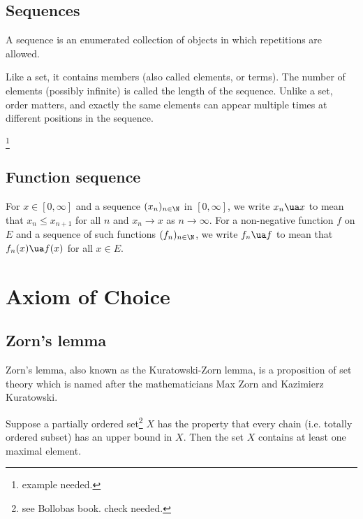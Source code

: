 \subsection{Sequences}

\begin{definition}[sequence]
A sequence is an enumerated collection of objects in which repetitions are allowed.
\end{definition}

\begin{remark}
Like a set, it contains members (also called elements, or terms). The number of elements (possibly infinite) is called the length of the sequence. Unlike a set, order matters, and exactly the same elements can appear multiple times at different positions in the sequence.
\end{remark}

\begin{example}
\footnote{example needed.}
\end{example}

\subsection{Function sequence}

\begin{definition}
For $x \in [0,\infty]$ and a sequence $(x_n)_{n \in\N}$ in $[0,\infty]$, we write $x_n \ua x$ to mean that $x_n \leq x_{n+1}$ for all $n$ and $x_n \to x$ as $n \to \infty$. For a non-negative
function $f$ on $E$ and a sequence of such functions $(f_n)_{n \in \N}$, we write $f_n \ua f$ to mean that $f_n(x) \ua f(x)$ for all $x \in E$.
\end{definition}


\section{Axiom of Choice}

\subsection{Zorn's lemma}

Zorn's lemma, also known as the Kuratowski-Zorn lemma, is a proposition of set theory which is named after the mathematicians Max Zorn and Kazimierz Kuratowski.

\begin{lemma}\label{lem:zorn}
Suppose a partially ordered set\footnote{see Bollobas book. check needed.} $X$ has the property that every chain (i.e. totally ordered subset) has an upper bound in $X$. Then the set $X$ contains at least one maximal element.
\end{lemma}


